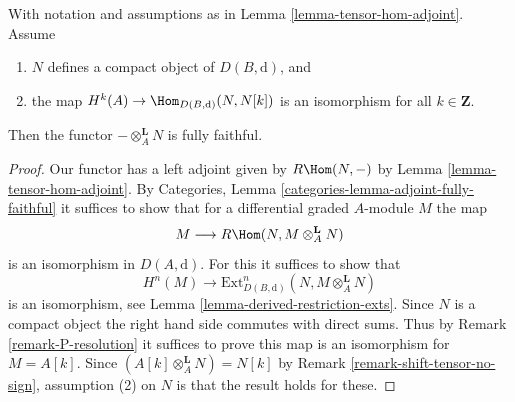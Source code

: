 \begin{lemma}
\label{lemma-tensor-with-compact-fully-faithful}
With notation and assumptions as in Lemma \ref{lemma-tensor-hom-adjoint}.
Assume
\begin{enumerate}
\item $N$ defines a compact object of $D(B, \text{d})$, and
\item the map $H^k(A) \to \Hom_{D(B, \text{d})}(N, N[k])$ is an
isomorphism for all $k \in \mathbf{Z}$.
\end{enumerate}
Then the functor $-\otimes_A^\mathbf{L} N$ is fully faithful.
\end{lemma}

\begin{proof}
Our functor has a left adjoint given by
$R\Hom(N, -)$ by Lemma \ref{lemma-tensor-hom-adjoint}.
By Categories, Lemma \ref{categories-lemma-adjoint-fully-faithful}
it suffices to show that for a differential graded $A$-module $M$
the map
$$
M \longrightarrow R\Hom(N, M \otimes_A^\mathbf{L} N)
$$
is an isomorphism in $D(A, \text{d})$. For this it suffices to show that
$$
H^n(M) \longrightarrow
\text{Ext}^n_{D(B, \text{d})}(N, M \otimes_A^\mathbf{L} N)
$$
is an isomorphism, see Lemma \ref{lemma-derived-restriction-exts}.
Since $N$ is a compact object the right hand side commutes
with direct sums. Thus by Remark \ref{remark-P-resolution}
it suffices to prove this map is an isomorphism for $M = A[k]$.
Since $(A[k] \otimes_A^\mathbf{L} N) = N[k]$ by
Remark \ref{remark-shift-tensor-no-sign},
assumption (2) on $N$ is that the result holds for these.
\end{proof}
